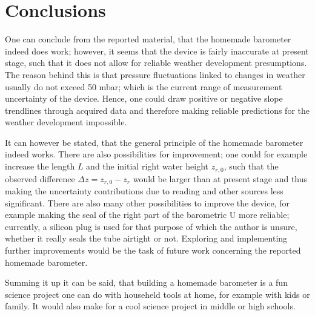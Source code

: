 \documentclass[a4paper,11pt, twocolumn]{article}
\begin{document}
\section{Conclusions}
One can conclude from the reported material, that the homemade barometer indeed does work; however, it seems that the device is fairly inaccurate at present stage, such that it does not allow for reliable weather development presumptions. The reason behind this is that pressure fluctuations linked to changes in weather usually do not exceed 50 mbar; which is the current range of measurement uncertainty of the device. Hence, one could draw positive or negative slope trendlines through acquired data and therefore making reliable predictions for the weather development impossible.

It can however be stated, that the general principle of the homemade barometer indeed works. There are also possibilities for improvement; one could for example increase the length $L$ and the initial right water height $z_{r,0}$, such that the observed difference $\Delta z = z_{r,0}-z_r$ would be larger than at present stage and thus making the uncertainty contributions due to reading and other sources less significant. There are also many other possibilities to improve the device, for example making the seal of the right part of the barometric U more reliable; currently, a silicon plug is used for that purpose of which the author is unsure, whether it really seals the tube airtight or not. Exploring and implementing further improvements would be the task of future work concerning the reported homemade barometer.

Summing it up it can be said, that building a homemade barometer is a fun science project one can do with househeld tools at home, for example with kids or family. It would also make for a cool science project in middle or high schools.

\appendix
\end{document}
